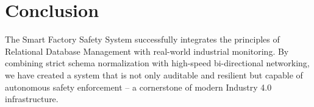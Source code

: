 \documentclass[12pt, a4paper]{article}
\begin{document}
\section{Conclusion}
The Smart Factory Safety System successfully integrates the principles of Relational Database Management with real-world industrial monitoring. By combining strict schema normalization with high-speed bi-directional networking, we have created a system that is not only auditable and resilient but capable of autonomous safety enforcement -- a cornerstone of modern Industry 4.0 infrastructure.
\end{document}
